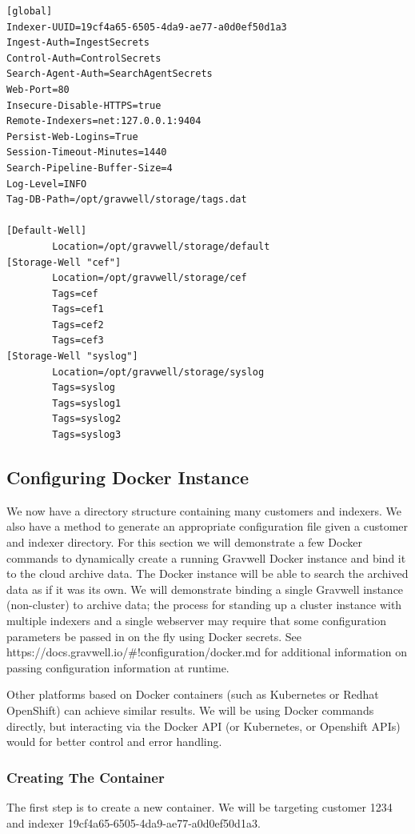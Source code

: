 \begin{Verbatim}[breaklines=true]
[global]
Indexer-UUID=19cf4a65-6505-4da9-ae77-a0d0ef50d1a3
Ingest-Auth=IngestSecrets
Control-Auth=ControlSecrets
Search-Agent-Auth=SearchAgentSecrets
Web-Port=80
Insecure-Disable-HTTPS=true
Remote-Indexers=net:127.0.0.1:9404
Persist-Web-Logins=True
Session-Timeout-Minutes=1440
Search-Pipeline-Buffer-Size=4
Log-Level=INFO
Tag-DB-Path=/opt/gravwell/storage/tags.dat

[Default-Well]
        Location=/opt/gravwell/storage/default
[Storage-Well "cef"]
        Location=/opt/gravwell/storage/cef
        Tags=cef
        Tags=cef1
        Tags=cef2
        Tags=cef3
[Storage-Well "syslog"]
        Location=/opt/gravwell/storage/syslog
        Tags=syslog
        Tags=syslog1
        Tags=syslog2
        Tags=syslog3
\end{Verbatim}

\subsection{Configuring Docker Instance}

We now have a directory structure containing many customers and
indexers. We also have a method to generate an appropriate configuration
file given a customer and indexer directory. For this section we will
demonstrate a few Docker commands to dynamically create a running
Gravwell Docker instance and bind it to the cloud archive data. The
Docker instance will be able to search the archived data as if it was
its own. We will demonstrate binding a single Gravwell instance
(non-cluster) to archive data; the process for standing up a cluster
instance with multiple indexers and a single webserver may require that
some configuration parameters be passed in on the fly using Docker
secrets. See https://docs.gravwell.io/\#!configuration/docker.md
for additional information on passing configuration information at
runtime.

Other platforms based on Docker containers (such as Kubernetes or
Redhat OpenShift) can achieve similar results. We will be using Docker
commands directly, but interacting via the Docker API (or Kubernetes, or
Openshift APIs) would for better control and error handling.

\subsubsection{Creating The Container}

The first step is to create a new container. We will be targeting
customer 1234 and indexer 19cf4a65-6505-4da9-ae77-a0d0ef50d1a3.

